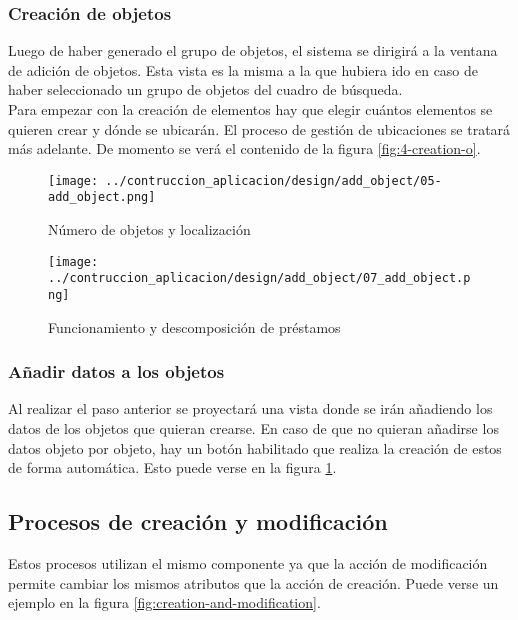 \subsubsection{Creación de objetos}
Luego de haber generado el grupo de objetos, el sistema se dirigirá a la ventana de adición de objetos. Esta vista es la misma a la que hubiera ido en caso de haber seleccionado un grupo de objetos del cuadro de búsqueda.
\\Para empezar con la creación de elementos hay que elegir cuántos elementos se quieren crear y dónde se ubicarán. El proceso de gestión de ubicaciones se tratará más adelante. De momento se verá el contenido de la figura \ref{fig:4-creation-o}.

\begin{figure}[ht]
    \begin{minipage}{0.40\textwidth}
        \centering
        \texttt{[image: ../contruccion\_aplicacion/design/add\_object/05-add\_object.png]}
        \caption{Número de objetos y localización}\label{fig:4-creation-o}
    \end{minipage}\hfill
    \begin{minipage}{0.52\textwidth}
        \centering
        \texttt{[image: ../contruccion\_aplicacion/design/add\_object/07\_add\_object.png]}
        \caption{Funcionamiento y descomposición de préstamos}\label{fig:5-creation-o}
    \end{minipage}
\end{figure}

\subsubsection{Añadir datos a los objetos}
Al realizar el paso anterior se proyectará una vista donde se irán añadiendo los datos de los objetos que quieran crearse. En caso de que no quieran añadirse los datos objeto por objeto, hay un botón habilitado que realiza la creación de estos de forma automática. Esto puede verse en la figura \ref{fig:5-creation-o}.

\subsection{Procesos de creación y modificación}
Estos procesos utilizan el mismo componente ya que la acción de modificación permite cambiar los mismos atributos que la acción de creación. Puede verse un ejemplo en la figura \ref{fig:creation-and-modification}.

